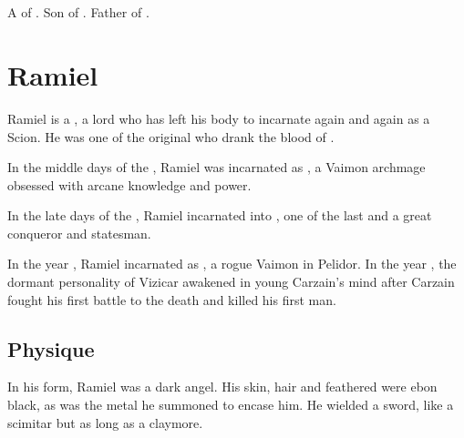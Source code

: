 \section{\Ozariel}
\index{\Ozariel}
A \ketheran{} \resphan{} of \Mystraacht. 
Son of . 
Father of . 















\section{Ramiel}
Ramiel is a \Malach, a \resphan{} lord who has left his \resphan{} body to incarnate again and again as a \human{} Scion. 
He was one of the original \satharioth{} who drank the blood of \Nexagglachel. 


In the middle days of the \VaimonCaliphate, Ramiel was incarnated as , a Vaimon archmage obsessed with arcane knowledge and power. 

In the late days of the \caliphate, Ramiel incarnated into , one of the last \VaimonCaliphs and a great conqueror and statesman. 

In the year , Ramiel incarnated as \CarzainDeracilleShireyo, a rogue Vaimon in Pelidor. In the year , the dormant personality of Vizicar awakened in young Carzain's mind after Carzain fought his first battle to the death and killed his first man. 









\subsection{Physique}
In his \resphan{} form, Ramiel was a dark angel. 
His skin, hair and feathered were ebon black, as was the metal \armour he summoned to encase him. 
He wielded a sword, like a scimitar but as long as a claymore. 

